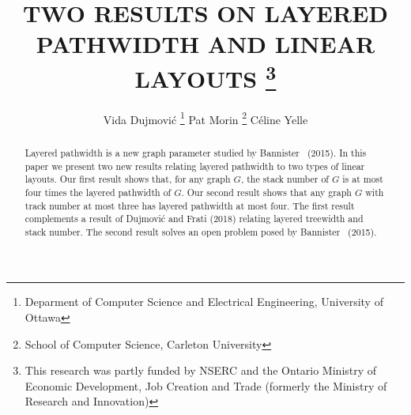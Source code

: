 \documentclass{patmorin}
\title{\MakeUppercase{Two Results on Layered Pathwidth and Linear Layouts}%
  \thanks{This research was partly funded by NSERC and the Ontario Ministry of Economic Development, Job Creation and Trade (formerly the Ministry of Research and Innovation)}}
\author{Vida Dujmović%
  \thanks{Deparment of Computer Science and Electrical Engineering, University of Ottawa}\qquad
  Pat Morin%
  \thanks{School of Computer Science, Carleton University}\qquad
  Céline Yelle\footnotemark[2]}
\date{}
\begin{document}
%
%
%

%
\maketitle              %
%


\begin{abstract}
  Layered pathwidth is a new graph parameter studied by Bannister \etal\ (2015). In this paper we present two new results relating layered pathwidth to two types of linear layouts.  Our first result shows that, for any graph $G$, the stack number of $G$ is at most four times the layered pathwidth of $G$.   Our second result shows that any graph $G$ with track number at most three has layered pathwidth at most four.  The first result complements a result of Dujmović and Frati (2018) relating layered treewidth and stack number.  The second result solves an open problem posed by Bannister \etal\ (2015).
\end{abstract}
\end{document}

